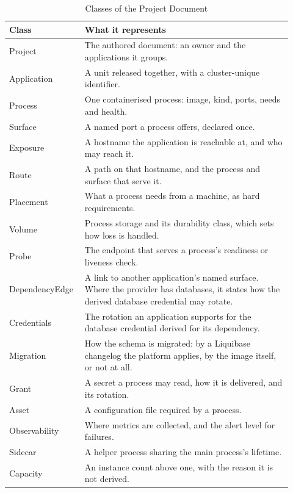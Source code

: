 \begin{table}[!htbp]
\centering
\small
\begin{tabular}{>{\raggedright\arraybackslash}p{0.22\linewidth}>{\raggedright\arraybackslash}p{0.70\linewidth}}
\hline
\textbf{Class} & \textbf{What it represents} \\
\hline
Project & The authored document: an owner and the applications it groups. \\
Application & A unit released together, with a cluster-unique identifier. \\
Process & One containerised process: image, kind, ports, needs and health. \\
Surface & A named port a process offers, declared once. \\
Exposure & A hostname the application is reachable at, and who may reach it. \\
Route & A path on that hostname, and the process and surface that serve it. \\
Placement & What a process needs from a machine, as hard requirements. \\
Volume & Process storage and its durability class, which sets how loss is handled. \\
Probe & The endpoint that serves a process's readiness or liveness check. \\
DependencyEdge & A link to another application's named surface. Where the provider has databases, it states how the derived database credential may rotate. \\
Credentials & The rotation an application supports for the database credential derived for its dependency. \\
Migration & How the schema is migrated: by a Liquibase changelog the platform applies, by the image itself, or not at all. \\
Grant & A secret a process may read, how it is delivered, and its rotation. \\
Asset & A configuration file required by a process. \\
Observability & Where metrics are collected, and the alert level for failures. \\
Sidecar & A helper process sharing the main process's lifetime. \\
Capacity & An instance count above one, with the reason it is not derived. \\
\hline
\end{tabular}
\caption{Classes of the Project Document}
\label{tab:sourceclasses}
\end{table}

